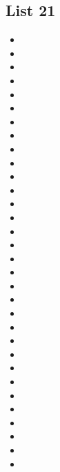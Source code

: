 \documentclass[a4paper,10pt]{article}
\begin{document}
\begin{CJK*}{UTF8}{gkai}
\section{List 21}
\begin{itemize}
\item 
\item 
\item 
\item 
\item 
\item 
\item 
\item 
\item 
\item 
\item 
\item 
\item 
\item 
\item 
\item 
\item 
\item 
\item 
\item 
\item 
\item 
\item 
\item 
\item 
\item 
\item 
\item 
\item 
\item 
\item 
\item 
\end{itemize}

\newpage

\end{CJK*}
\end{document}
